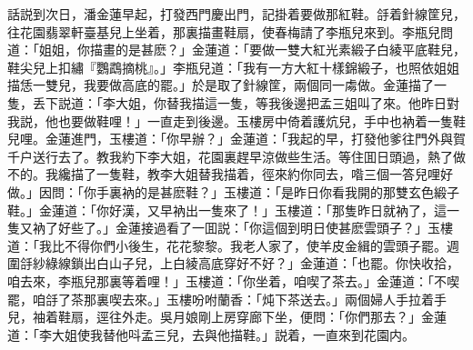 話説到次日，潘金蓮早起，打發西門慶出門，記掛着要做那紅鞋。㧱着針線筐兒，往花園翡翠軒臺基兒上坐着，那裏描畫鞋扇，使春梅請了李瓶兒來到。李瓶兒問道：「姐姐，你描畫的是甚麽？」金蓮道：「要做一雙大紅光素緞子白綾平底鞋兒，鞋尖兒上扣繡『鸚鵡摘桃』。」李瓶兒道：「我有一方大紅十樣錦緞子，也照依姐姐描恁一雙兒，我要做高底的罷。」於是取了針線筐，兩個同一䖏做。金蓮描了一隻，丢下説道：「李大姐，你替我描這一隻，等我後邊把孟三姐叫了來。他昨日對我説，他也要做鞋哩！」一直走到後邊。玉樓房中倚着護炕兒，手中也衲着一隻鞋兒哩。金蓮進門，玉樓道：「你早辦？」金蓮道：「我起的早，打發他爹往門外與賀千户送行去了。教我約下李大姐，花園裏趕早涼做些生活。等住囬日頭過，熱了做不的。我纔描了一隻鞋，教李大姐替我描着，徑來約你同去，喒三個一答兒哩好做。」因問：「你手裏衲的是甚麽鞋？」玉樓道：「是昨日你看我開的那雙玄色緞子鞋。」金蓮道：「你好漢，又早衲出一隻來了！」玉樓道：「那隻昨日就衲了，這一隻又衲了好些了。」金蓮接過看了一囬説：「你這個到明日使甚麽雲頭子？」玉樓道：「我比不得你們小後生，花花黎黎。我老人家了，使羊皮金緝的雲頭子罷。週圍㧱紗綠線鎖出白山子兒，上白綾高底穿好不好？」金蓮道：「也罷。你快收拾，咱去來，李瓶兒那裏等着哩！」玉樓道：「你坐着，咱喫了茶去。」金蓮道：「不喫罷，咱㧱了茶那裏喫去來。」玉樓吩咐蘭香：「炖下茶送去。」兩個婦人手拉着手兒，袖着鞋扇，逕往外走。吳月娘剛上房穿廊下坐，便問：「你們那去？」金蓮道：「李大姐使我替他呌孟三兒，去與他描鞋。」説着，一直來到花園内。

